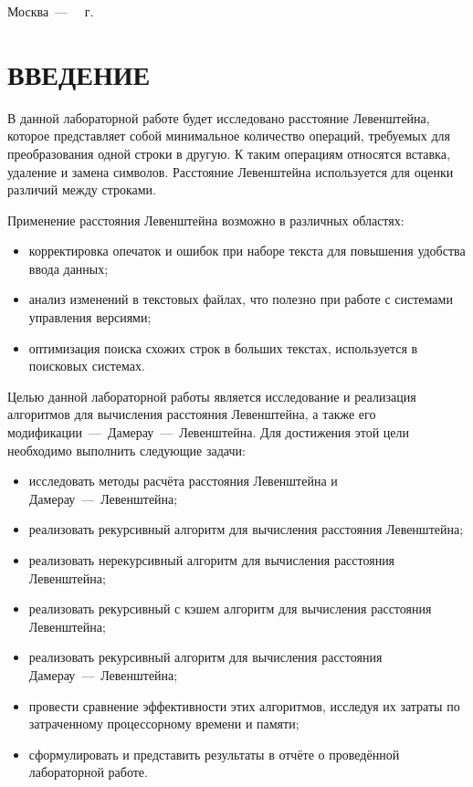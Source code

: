 \documentclass[a4paper, 12pt]{extreport}
\begin{document}
\begin{titlepage}
	\begin{center}
		\vfill
		Москва~---~\the\year
		~г.
	\end{center}
	\restoregeometry
\end{titlepage}

\def\contentsname{\begin{center}\MakeUppercase{СОДЕРЖАНИЕ}\end{center}}
\tableofcontents
\setcounter{page}{2}

\chapter*{ВВЕДЕНИЕ}
В данной лабораторной работе будет исследовано расстояние Левенштейна, которое представляет собой минимальное количество операций, требуемых для преобразования одной строки в другую. К таким операциям относятся вставка, удаление и замена символов. Расстояние Левенштейна используется для оценки различий между строками.

Применение расстояния Левенштейна возможно в различных областях:
\begin{itemize}
    \item[--] корректировка опечаток и ошибок при наборе текста для повышения удобства ввода данных;
    \item[--] анализ изменений в текстовых файлах, что полезно при работе с системами управления версиями;
    \item[--] оптимизация поиска схожих строк в больших текстах, используется в поисковых системах.
\end{itemize}

Целью данной лабораторной работы является исследование и реализация алгоритмов для вычисления расстояния Левенштейна, а также его модификации~---~Дамерау~---~Левенштейна. 
Для достижения этой цели необходимо выполнить следующие задачи:

\begin{itemize}
    \item[--] исследовать методы расчёта расстояния Левенштейна и Дамерау~---~Левенштейна;
    \item[--] реализовать рекурсивный алгоритм для вычисления расстояния Левенштейна;
    \item[--] реализовать нерекурсивный алгоритм для вычисления расстояния Левенштейна;
    \item[--] реализовать рекурсивный с кэшем алгоритм для вычисления расстояния Левенштейна;
    \item[--] реализовать рекурсивный алгоритм для вычисления расстояния Дамерау~---~Левенштейна;
    \item[--] провести сравнение эффективности этих алгоритмов, исследуя их затраты по затраченному процессорному времени и памяти;
    \item[--] сформулировать и представить результаты в отчёте о проведённой лабораторной работе.
\end{itemize}
\end{document}
